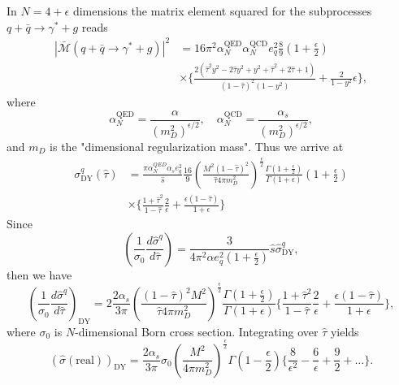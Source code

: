 In $N=4+\epsilon$ dimensions the matrix element squared for the subprocesses $q+\bar{q}\to\gamma^\ast+g$ reads 
\begin{align}
\left| \bar{\mathcal{M}}(q+\bar{q}\to\gamma^\ast+g) \right|^2&=16\pi^2\alpha_N^\text{QED}\alpha_N^\text{QCD}e^2_q\frac{8}{9}\left(1+\frac{\epsilon}{2}\right)\nonumber\\
&\times\biggl\{ \frac{2(\hat{\tau}^2y^2-2\hat{\tau}y^2+y^2+\hat{\tau}^2+2\hat{\tau}+1)}{(1-\hat{\tau})^2(1-y^2)}+\frac{2}{1-y^2}\epsilon \biggr\},
\end{align}
where
\begin{equation}
\alpha^\text{QED}_N=\frac{\alpha}{(m^2_D)^{\epsilon/2}}, \quad \alpha^\text{QCD}_N=\frac{\alpha_s}{(m^2_D)^{\epsilon/2}},
\end{equation}
and $m_D$ is the "dimensional regularization mass". Thus we arrive at
\begin{align}
\sigma^q_\text{DY}(\hat{\tau})&=\frac{\pi\alpha_N^{QED}\alpha_s e^2_q}{\hat{s}}\frac{16}{9}\left(\frac{M^2(1-\hat{\tau})^2}{\hat{\tau}4\pi m^2_D}\right)^\frac{\epsilon}{2}\frac{\Gamma\left(1+\frac{\epsilon}{2}\right)}{\Gamma(1+\epsilon)}\left(1+\frac{\epsilon}{2}\right)\nonumber\\
&\times\biggl\{\frac{1+\hat{\tau}^2}{1-\hat{\tau}}\frac{2}{\epsilon}+\frac{\epsilon(1-\hat{\tau})}{1+\epsilon}\biggr\}
\end{align}
Since 
\begin{equation}
\left(\frac{1}{\sigma_0}\frac{d\hat{\sigma}^q}{d\hat{\tau}}\right)=\frac{3}{4\pi^2\alpha e^2_q(1+\frac{\epsilon}{2})}\hat{s}\hat{\sigma}^q_\text{DY},
\end{equation}
then we have 
\begin{equation}
\left(\frac{1}{\sigma_0}\frac{d\hat{\sigma}^q}{d\hat{\tau}}\right)_\text{DY}=2\frac{2\alpha_s}{3\pi}\left(\frac{(1-\hat{\tau})^2M^2}{\hat{\tau}4\pi m_D^2}\right)^\frac{\epsilon}{2}\frac{\Gamma(1+\frac{\epsilon}{2})}{\Gamma(1+\epsilon)}\biggl\{\frac{1+\hat{\tau}^2}{1-\hat{\tau}}\frac{2}{\epsilon}+\frac{\epsilon(1-\hat{\tau})}{1+\epsilon}\biggr\},
\end{equation}
where $\sigma_0$ is $N$-dimensional Born cross section. Integrating over $\hat{\tau}$ yields
\begin{equation}
(\hat{\sigma}(\text{real}))_\text{DY}=\frac{2\alpha_s}{3\pi}\sigma_0\left(\frac{M^2}{4\pi m^2_D}\right)^\frac{\epsilon}{2}\Gamma\left(1-\frac{\epsilon}{2}\right)\biggl\{\frac{8}{\epsilon^2}-\frac{6}{\epsilon}+\frac{9}{2}+\ldots\biggr\}.
\end{equation}

